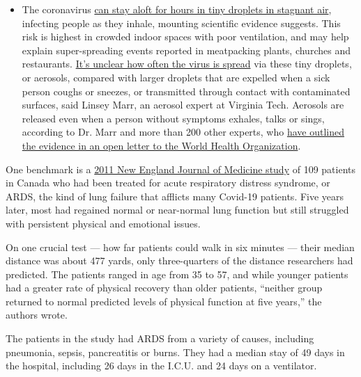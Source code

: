 \begin{itemize}
  \begin{itemize}
  \tightlist
  \item
    The coronavirus
    \href{https://www.nytimes.com/2020/07/04/health/239-experts-with-one-big-claim-the-coronavirus-is-airborne.html?action=click\&pgtype=Article\&state=default\&region=MAIN_CONTENT_3\&context=storylines_faq}{can
    stay aloft for hours in tiny droplets in stagnant air}, infecting
    people as they inhale, mounting scientific evidence suggests. This
    risk is highest in crowded indoor spaces with poor ventilation, and
    may help explain super-spreading events reported in meatpacking
    plants, churches and restaurants.
    \href{https://www.nytimes.com/2020/07/06/health/coronavirus-airborne-aerosols.html?action=click\&pgtype=Article\&state=default\&region=MAIN_CONTENT_3\&context=storylines_faq}{It's
    unclear how often the virus is spread} via these tiny droplets, or
    aerosols, compared with larger droplets that are expelled when a
    sick person coughs or sneezes, or transmitted through contact with
    contaminated surfaces, said Linsey Marr, an aerosol expert at
    Virginia Tech. Aerosols are released even when a person without
    symptoms exhales, talks or sings, according to Dr. Marr and more
    than 200 other experts, who
    \href{https://academic.oup.com/cid/article/doi/10.1093/cid/ciaa939/5867798}{have
    outlined the evidence in an open letter to the World Health
    Organization}.
  \end{itemize}
\end{itemize}

One benchmark is a
\href{https://www.nejm.org/doi/full/10.1056/nejmoa1011802}{2011 New
England Journal of Medicine study} of 109 patients in Canada who had
been treated for acute respiratory distress syndrome, or ARDS, the kind
of lung failure that afflicts many Covid-19 patients. Five years later,
most had regained normal or near-normal lung function but still
struggled with persistent physical and emotional issues.

On one crucial test --- how far patients could walk in six minutes ---
their median distance was about 477 yards, only three-quarters of the
distance researchers had predicted. The patients ranged in age from 35
to 57, and while younger patients had a greater rate of physical
recovery than older patients, ``neither group returned to normal
predicted levels of physical function at five years,'' the authors
wrote.

The patients in the study had ARDS from a variety of causes, including
pneumonia, sepsis, pancreatitis or burns. They had a median stay of 49
days in the hospital, including 26 days in the I.C.U. and 24 days on a
ventilator.

